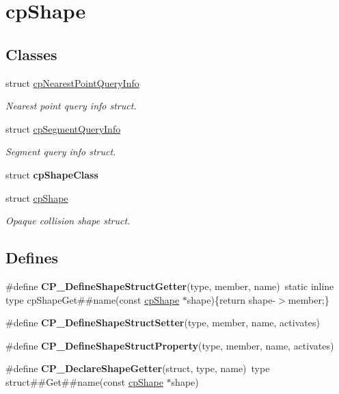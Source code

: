 \hypertarget{group__cp_shape}{\section{cp\-Shape}
\label{group__cp_shape}
}
\subsection*{Classes}
\begin{DoxyCompactItemize}
\item 
struct \hyperlink{structcp_nearest_point_query_info}{cp\-Nearest\-Point\-Query\-Info}
\begin{DoxyCompactList}\small\item\em Nearest point query info struct. \end{DoxyCompactList}\item 
struct \hyperlink{structcp_segment_query_info}{cp\-Segment\-Query\-Info}
\begin{DoxyCompactList}\small\item\em Segment query info struct. \end{DoxyCompactList}\item 
struct {\bfseries cp\-Shape\-Class}
\item 
struct \hyperlink{structcp_shape}{cp\-Shape}
\begin{DoxyCompactList}\small\item\em Opaque collision shape struct. \end{DoxyCompactList}\end{DoxyCompactItemize}
\subsection*{Defines}
\begin{DoxyCompactItemize}
\item 
\hypertarget{group__cp_shape_ga547d234d61a90a7128ab1f3d00e31939}{\#define {\bfseries C\-P\-\_\-\-Define\-Shape\-Struct\-Getter}(type, member, name)~static inline type cp\-Shape\-Get\#\#name(const \hyperlink{structcp_shape}{cp\-Shape} $\ast$shape)\{return shape-\/$>$member;\}}\label{group__cp_shape_ga547d234d61a90a7128ab1f3d00e31939}

\item 
\#define {\bfseries C\-P\-\_\-\-Define\-Shape\-Struct\-Setter}(type, member, name, activates)
\item 
\#define {\bfseries C\-P\-\_\-\-Define\-Shape\-Struct\-Property}(type, member, name, activates)
\item 
\hypertarget{group__cp_shape_gac3014abac96cf5fcdff8415043bd5545}{\#define {\bfseries C\-P\-\_\-\-Declare\-Shape\-Getter}(struct, type, name)~type struct\#\#Get\#\#name(const \hyperlink{structcp_shape}{cp\-Shape} $\ast$shape)}\label{group__cp_shape_gac3014abac96cf5fcdff8415043bd5545}

\end{DoxyCompactItemize}
